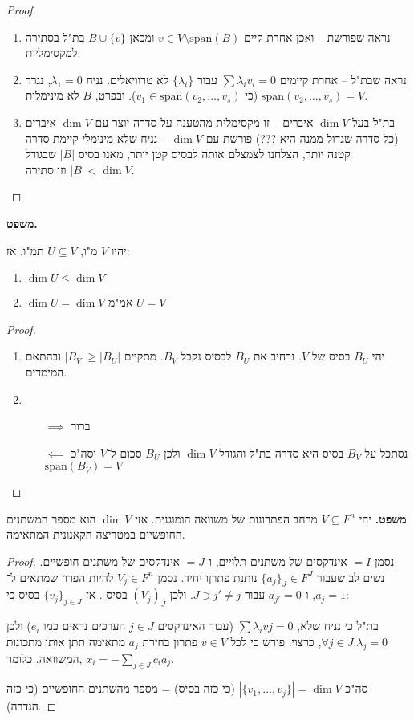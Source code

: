\documentclass[]{article}
\begin{document}
	\begin{proof}\,
		\begin{enumerate}
			\item נראה שפורשת – ואכן אחרת קיים $v \in V \setminus \mathrm{span}(B)$ ומכאן $B \cup \{v\}$ בת"ל בסתירה למקסימליות. 
			\item נראה שבת"ל – אחרת קיימים $\sum \lambda_iv_i = 0$ עבור $\{\lambda_i\}$ לא טרוויאלים. נניח $\lambda_1 = 0$, נגרר $\mathrm{span}(v_2, \dots, v_s) = V$ (כי $v_1 \in \mathrm{span}(v_2, \dots, v_s)$). ובפרט, $B$ לא מינימלית. 
			\item בת"ל בעל $\dim V$ איברים – זו מקסימלית מהטענה על סדרה יוצר עם $\dim V$ איברים (כל סדרה שגדול ממנה היא ???)
			פורשת עם $\dim V$ – נניח שלא מינימלי קיימת סדרה קטנה יותר, הצלחנו לצמצלם אותה לבסיס קטן יותר, מאנו בסיס $|B|$ שבגודל $|B| < \dim V$ וזו סתירה. 
		\end{enumerate}
	\end{proof}
	
	\textbf{משפט. }
	
		יהיו $V$ מ"ו, $U \subseteq V$ תמ"ו. אז: 
	\begin{enumerate}
		\item $\dim U \le \dim V$
		\item $\dim U = \dim V$ אמ"מ $U = V$
	\end{enumerate}
	
	\begin{proof}
		\begin{enumerate}
			\item יהי $B_U$ בסיס של $V$. נרחיב את $B_U$ לבסיס נקבל $B_V$. מתקיים $|B_V| \ge |B_U|$ ובהתאם המימדים. 
			\item \, 
			\begin{enumerate}
				\item[$\implies$] ברור
				\item[$\impliedby$] נסתכל על $B_V$ בסיס היא סדרה בת"ל והגודל $\dim V$ ולכן $B_U$ סכום ל־$V$ וסה"כ $\mathrm{span}(B_V) = V$
			\end{enumerate}
		\end{enumerate}
	\end{proof}
	
	\textbf{משפט. }יהי $V \subseteq F^n$ מרחב הפתרונות של משוואה הומוגנית. אזי $\dim V$ הוא מספר המשתנים החופשיים במטריצה הקאנונית המתאימה. \begin{proof}
		נסמן $= I$ אינדקסים של משתנים תלויים, ו־$= J$ אינדקסים של משתנים חופשיים. נשים לב שעבור $\{a_j\}_J \in F^J$ נותנת פתרןו יחיד. נסמן $V_j \in F^n$ להיות הפרון שמתאים ל־$a_j = 1$, ו־$a_{j'} = 0$ עבור $J \ni j' \neq j$. ולכן $(V_j)_J$ בסיס . אז $\{v_j\}_{j \in J}$ בסיס כי: 
		
		בת"ל כי נניח שלא, $\sum \lambda_i vj = 0$ (עבור האינדקסים $j \in J$ הערכים נראים כמו $e_i$) ולכן $\forall j \in J. \lambda_j = 0$, כרצוי. פורש כי לכל $v \in V$ פתרון בחירת $a_j$ מתאימה תתן אותו מתכונות המשוואה. כלומר, $x_i = - \sum_{j \in J} c_ia_j$. 
		
		סה"כ $|\{v_1, \dots, v_j\}| = \dim V$ (כי כזה בסיס) = מספר מהשתנים החופשיים (כי כזה הגדרה). 
	\end{proof}
	
\end{document}
